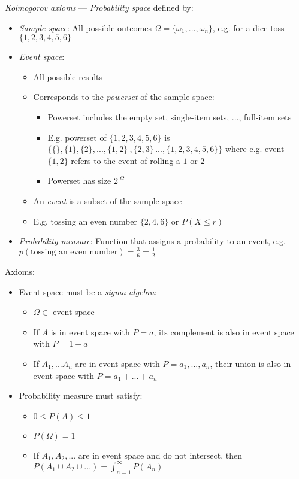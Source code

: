 \emph{Kolmogorov axioms} --- 
\emph{Probability space} defined by:
\begin{itemize}
    \item \emph{Sample space}: All possible outcomes $\Omega = \{\omega_1,...,\omega_n\}$, e.g. for a dice toss $\{ 1,2,3,4,5,6 \}$
    \item \emph{Event space}: 
    \begin{itemize}
        \item All possible results
        \item Corresponds to the \emph{powerset} of the sample space:
        \begin{itemize}
            \item Powerset includes the empty set, single-item sets, ..., full-item sets
            \item E.g. powerset of $\{ 1,2,3,4,5,6 \}$ is $\{ \{\}, \{1\}, \{2\}, ..., \{1,2\}\ ,  \{2,3\}\, ...,  \{1,2,3,4,5,6\}\}$ where e.g. event $\{1,2\}$ refers to the event of rolling a $1$ or $2$
            \item Powerset has size $2^{|\Omega|}$
        \end{itemize}
        \item An \emph{event} is a subset of the sample space
        \item E.g. tossing an even number $\{ 2,4,6 \}$ or $P(X \leq r)$
    \end{itemize}
    \item \emph{Probability measure}: Function that assigns a probability to an event, e.g. $p(\textrm{tossing an even number}) = \frac{3}{6} = \frac{1}{2}$ 
\end{itemize}
Axioms:
\begin{itemize}
    \item Event space must be a \emph{sigma algebra}:
    \begin{itemize}
        \item $\Omega \in $ event space
        \item If $A$ is in event space with $P = a$, its complement is also in event space with $P = 1-a$
        \item If $A_1,...A_n$ are in event space with $P=a_1, ..., a_n$, their union is also in event space with $P = a_1 + ... + a_n$
    \end{itemize}
    \item Probability measure must satisfy:
    \begin{itemize}
        \item $0 \leq P(A) \leq 1$
        \item $P({\Omega}) = 1$
        \item If $A_1,A_2,...$ are in event space and do not intersect, then $P(A_1 \cup A_2 \cup ...) = \int_{n=1}^{\infty} P(A_n)$
    \end{itemize}
\end{itemize}

